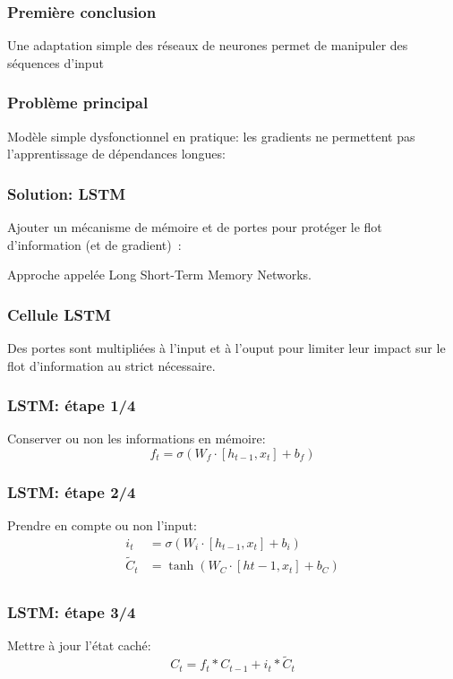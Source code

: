 \documentclass{formation}
\begin{document}
\begin{frame}
  \frametitle{Première conclusion}

  Une adaptation simple des réseaux de neurones permet de manipuler
  des séquences d'input

\end{frame}

\begin{frame}
  \frametitle{Problème principal}

  Modèle simple dysfonctionnel en pratique: les gradients ne
  permettent pas l'apprentissage de dépendances longues:


\end{frame}

\begin{frame}
  \frametitle{Solution: LSTM}

  Ajouter un mécanisme de mémoire et de portes pour protéger le flot
  d'information (et de gradient) :


  Approche appelée Long Short-Term Memory Networks.
\end{frame}

\begin{frame}
  \frametitle{Cellule LSTM}
   Des portes sont multipliées à l'input et à
  l'ouput pour limiter leur impact sur le flot d'information au strict
  nécessaire.
\end{frame}

\begin{frame}
  \frametitle{LSTM: étape 1/4}
  Conserver ou non les informations en mémoire:
  \[
    f_t = \sigma(W_f \cdot [h_{t-1}, x_t] + b_f)
  \]
\end{frame}

\begin{frame}
  \frametitle{LSTM: étape 2/4}
  Prendre en compte ou non l'input:
    \begin{align*}
    i_t & = \sigma\left(W_i \cdot [h_{t-1}, x_t] + b_i\right) \\
    \tilde{C}_t & = \tanh\left(W_C \cdot [h{t-1}, x_t] + b_C\right) \\
    \end{align*}
\end{frame}

\begin{frame}
  \frametitle{LSTM: étape 3/4}
  Mettre à jour l'état caché:
  \[
    C_t = f_t * C_{t-1} + i_t * \tilde{C}_t
  \]
\end{frame}
\end{document}
